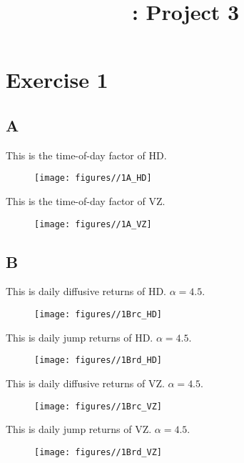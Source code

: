 \documentclass{report}
\title{\LectureTitle: Project 3}
\begin{document}
\maketitle
\newpage

\section{ Exercise 1}

\subsection{A}
This is the time-of-day factor of HD.
\begin{figure}[H]
        \centering 
         \texttt{[image: figures//1A\_HD]}
\end{figure}
This is the time-of-day factor of VZ.
\begin{figure}[H]
        \centering 
         \texttt{[image: figures//1A\_VZ]}
\end{figure}

\subsection{B}
This is daily diffusive returns of HD. $ \alpha = 4.5$.
\begin{figure}[H]
        \centering 
         \texttt{[image: figures//1Brc\_HD]}
\end{figure}

This is daily jump returns of HD. $ \alpha = 4.5$.
\begin{figure}[H]
        \centering 
         \texttt{[image: figures//1Brd\_HD]}
\end{figure}

This is daily diffusive returns of VZ. $ \alpha = 4.5$.
\begin{figure}[H]
        \centering 
         \texttt{[image: figures//1Brc\_VZ]}
\end{figure}

This is daily jump returns of VZ. $ \alpha = 4.5$.
\begin{figure}[H]
        \centering 
         \texttt{[image: figures//1Brd\_VZ]}
\end{figure}
\end{document}
